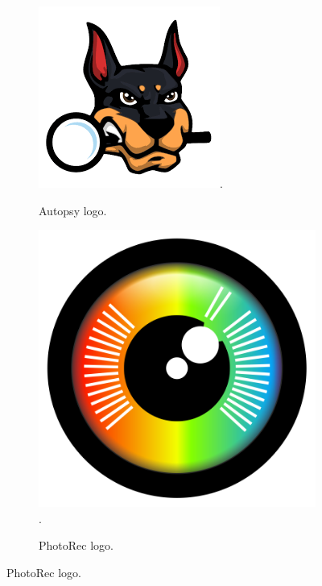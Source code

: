 \documentclass[12pt]{article}
\begin{document}
\begin{figure}[!ht]
    \centering
    \begin{subfigure}[b]{0.3\textwidth}
        \centering
        \includegraphics[width=\textwidth]{images/autopsy.png}.
        \caption{Autopsy logo.}
        \label{fig:autopsy}
    \end{subfigure}
    \hspace{30 pt}
    \begin{subfigure}[b]{0.3\textwidth}
        \centering
        \includegraphics[width=\textwidth]{images/photorec.png}.
        \caption{PhotoRec logo.}
    \label{fig:photorec}
    \end{subfigure}
\end{figure}
\end{document}
